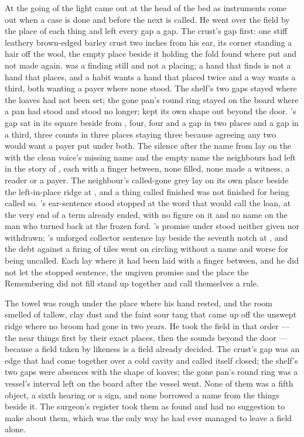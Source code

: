 At the going of the light  came out at the head of the bed as instruments come out when a case is done and before the next is called. He went over the field by the place of each thing and left every gap a gap. The crust's gap first: one stiff leathery brown-edged barley crust two inches from his ear, its corner standing a hair off the wool, the empty place beside it holding the fold found where put and not made again.  was a finding still and not a placing; a hand that finds is not a hand that places, and a habit wants a hand that placed twice and a way wants a third, both wanting a payer where none stood. The shelf's two gaps stayed where the loaves had not been set; the gone pan's round ring stayed on the board where a pan had stood and stood no longer;  kept its own shape out beyond the door. 's gap sat in its square beside  from , four, four and a gap in two places and a gap in a third, three counts in three places staying three because agreeing any two would want a payer put under both. The silence after the name from  lay on the  with the clean voice's missing name and the empty name the neighbours had left in the story of , each with a finger between, none filled, none made a witness, a reader or a payer. The neighbour's called-gone grey lay on its own place beside the left-in-place ridge at , and a thing called finished was not finished for being called so. 's ear-sentence stood stopped at the word that would call the loan, at the very end of a term already ended, with no figure on it and no name on the man who turned back at the frozen ford. 's promise under  stood neither given nor withdrawn; 's unforged collector sentence lay beside the seventh notch at , and the debt against a firing of tiles went on circling without a name and worse for being uncalled. Each lay where it had been laid with a finger between, and he did not let the stopped sentence, the ungiven promise and the place the Remembering did not fill stand up together and call themselves a rule.

The towel was rough under the place where his hand rested, and the room smelled of tallow, clay dust and the faint sour tang that came up off the unswept ridge where no broom had gone in two years. He took the field in that order --- the near things first by their exact places, then the sounds beyond the door --- because a field taken by likeness is a field already decided. The crust's gap was an edge that had come together over a cold cavity and called itself closed; the shelf's two gaps were absences with the shape of loaves; the gone pan's round ring was a vessel's interval left on the board after the vessel went. None of them was a fifth object, a sixth hearing or a sign, and none borrowed a name from the things beside it. The surgeon's register took them as found and had no suggestion to make about them, which was the only way he had ever managed to leave a field alone.

